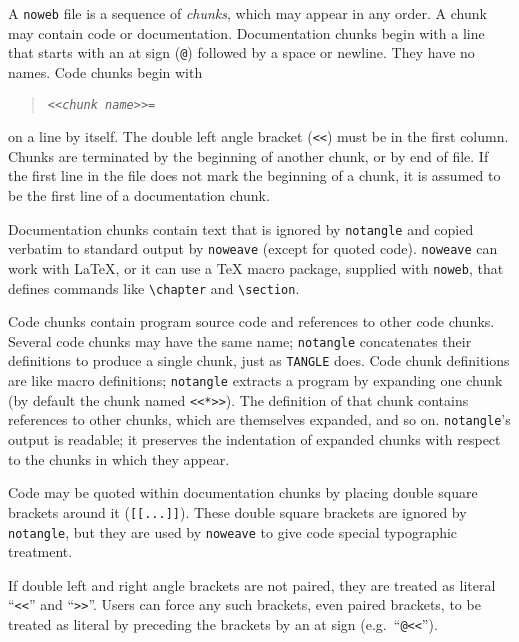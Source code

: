 A {\tt noweb} file is a sequence of {\em chunks}, which may appear in any order.
A chunk may contain code or documentation.
Documentation chunks begin with a line that starts with an at sign ({\tt @})
followed by a space or newline.
They have no names.
Code chunks begin with
\begin{quote} 
\tt <<{\it chunk name}>>=
\end{quote} 
on a line by itself.
The double left angle bracket ({\tt <<}) must be in the first column.
Chunks are terminated by the beginning of another chunk, or by end of file.
If the first line in the file does not mark the beginning of a
chunk, it is assumed to be the first line of a documentation chunk.

Documentation chunks contain text that is ignored by {\tt notangle}
and copied verbatim to standard output by
{\tt noweave} (except for quoted code).   
{\tt noweave} can work with {\LaTeX}, or it can use
a {\TeX} macro package, supplied with {\tt noweb}, that defines
commands like \verb+\chapter+ and \verb+\section+.

Code chunks contain program source code and references to other code
chunks.  
Several code chunks may have the same name; {\tt notangle}
concatenates their definitions to produce a single chunk, just as
 {\tt TANGLE} does.
Code chunk definitions are like macro definitions;
{\tt notangle} extracts a program by expanding one chunk (by default
the chunk named \verb+<<*>>+).
The definition of that chunk contains references to other chunks,
which are themselves expanded, and so on.
{\tt notangle}'s output is readable; it preserves the indentation of expanded
chunks with respect to the chunks in which they appear.

Code may be quoted within documentation chunks by placing double
square brackets around it ({\tt [[...]]}). 
These double square brackets are ignored by {\tt notangle}, but they
are used by {\tt noweave} to give code special typographic
treatment.

If double left and right angle brackets are not paired, they are
treated as literal ``{\tt<<}'' and ``{\tt>>}''.  Users can force any
such brackets, even paired brackets, to be treated as literal by
preceding the brackets by an at sign (e.g.~``{\tt @<<}'').

